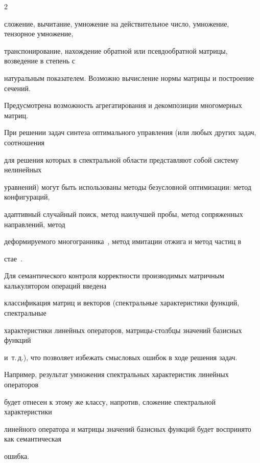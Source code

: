 \begin{multicols}{2}
{сложение, вычитание, умножение на действительное число, умножение, тензорное умножение, 


транспонирование, нахождение обратной или псевдообратной матрицы, возведение в степень с 


натуральным показателем. Возможно вы\-чис\-ле\-ние нормы матрицы и построение сечений. 


Предусмотрена возможность агрегатирования и декомпозиции многомерных матриц.





При решении задач синтеза оптимального управ\-ле\-ния (или любых других задач, соотношения 


для решения которых в спектральной области пред\-став\-ля\-ют собой сис\-тему нелинейных 


уравнений) могут быть использованы методы безусловной оптимизации: метод конфигураций, 


адаптивный случайный поиск, метод наилучшей пробы, метод сопряженных направлений, метод 


деформируемого многогранника~\cite{PanLet}, метод имитации отжига и метод час\-тиц в 


стае~\cite{Pan_GlobOpt}.





Для семантического контроля корректности производимых матричным калькулятором операций введена 


классификация матриц и векторов (спект\-раль\-ные характеристики функций, спект\-раль\-ные 


характеристики линейных операторов, мат\-ри\-цы-столб\-цы значений базисных функций 


и~т.\,д.), что позволяет избежать смысловых ошибок в ходе решения задач. 


Например, результат умножения спектральных характеристик линейных операторов 


будет отнесен к этому же классу, напротив, сложение спектральной характеристики 


линейного оператора и мат\-ри\-цы значений базисных функций будет воспринято как семантическая 


ошибка.


}





{\small\frenchspacing


{%


}}
\end{multicols}
